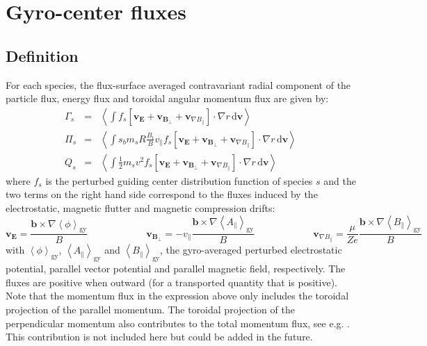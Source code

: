 \documentclass[a4paper]{report}
\begin{document}
\section{Gyro-center fluxes}
\subsection{Definition}
For each species, the flux-surface averaged contravariant radial component of the particle flux, energy flux and toroidal angular momentum flux are given by:
\begin{eqnarray}
 \Gamma_s &=& \left<\int f_s \left[\mathbf{v}_\mathbf{E} + \mathbf{v}_{\mathbf{B}_\perp} + \mathbf{v}_{\nabla B_\parallel}  \right]\cdot \nabla r\,\textrm{d}\mathbf{v}\right> \\
  \Pi_s   &=& \left<\int s_b m_s R \frac{B_t}{B}v_\parallel f_s  \left[\mathbf{v}_\mathbf{E} + \mathbf{v}_{\mathbf{B}_\perp} + \mathbf{v}_{\nabla B_\parallel}  \right] \cdot \nabla r\,\textrm{d}\mathbf{v}\right> \\
      Q_s &=& \left<\int \frac{1}{2}m_sv^2 f_s \left[\mathbf{v}_\mathbf{E} + \mathbf{v}_{\mathbf{B}_\perp} + \mathbf{v}_{\nabla B_\parallel}  \right] \cdot \nabla r\,\textrm{d}\mathbf{v}\right> 
\end{eqnarray}
where $f_s$ is the perturbed guiding center distribution function of species $s$ and the two terms on the right hand side correspond to the fluxes induced by the electrostatic, magnetic flutter and magnetic compression drifts:
\begin{equation}
 \mathbf{v}_\mathbf{E} = \frac{\mathbf{b}\times \nabla \left<\phi\right>_\textrm{gy} }{B} \qquad \qquad \qquad
 \mathbf{v}_{\mathbf{B}_\perp} = -v_\parallel \frac{\mathbf{b}\times \nabla \left<A_{\parallel}\right>_\textrm{gy}}{B}  \qquad \qquad \qquad
 \mathbf{v}_{\nabla B_\parallel} = \frac{\mu}{Ze} \frac{\mathbf{b}\times \nabla \left<B_{\parallel}\right>_\textrm{gy}}{B}
\end{equation}
with $\left<\phi\right>_\textrm{gy}$, $\left<A_{\parallel}\right>_\textrm{gy}$ and $\left<B_{\parallel}\right>_\textrm{gy}$, the gyro-averaged perturbed electrostatic potential, parallel vector potential and parallel magnetic field, respectively. The fluxes are positive when outward (for a transported quantity that is positive).\\
Note that the momentum flux in the expression above only includes the toroidal projection of the parallel momentum. The toroidal projection of the perpendicular momentum also contributes to the total momentum flux, see e.g. \cite{Scott:PoP2010}. This contribution is not included here but could be added in the future. 
\end{document}
